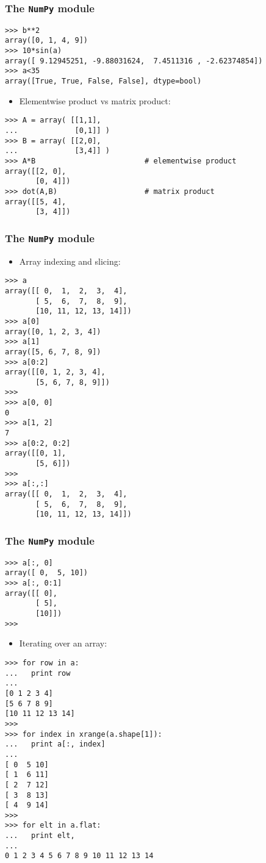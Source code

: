 \documentclass[handout]{beamer}
\numberwithin{equation}{section}
\begin{document}
\begin{frame}[fragile]
\frametitle{The {\tt NumPy} module}

\begin{lstlisting}[name=ex2]
>>> b**2
array([0, 1, 4, 9])
>>> 10*sin(a)
array([ 9.12945251, -9.88031624,  7.4511316 , -2.62374854])
>>> a<35
array([True, True, False, False], dtype=bool)
\end{lstlisting}

\pause
\begin{itemize}
\item Elementwise product vs matrix product:
\end{itemize}


\begin{lstlisting}[name=ex2]
>>> A = array( [[1,1],
...             [0,1]] )
>>> B = array( [[2,0],
...             [3,4]] )
>>> A*B                         # elementwise product
array([[2, 0],
       [0, 4]])
>>> dot(A,B)                    # matrix product
array([[5, 4],
       [3, 4]])
\end{lstlisting}
\end{frame}



\begin{frame}[fragile]
\frametitle{The {\tt NumPy} module}

\begin{itemize}
\item Array indexing and slicing:
\end{itemize}

\begin{lstlisting}[name=ex2]
>>> a
array([[ 0,  1,  2,  3,  4],
       [ 5,  6,  7,  8,  9],
       [10, 11, 12, 13, 14]])
>>> a[0]
array([0, 1, 2, 3, 4])
>>> a[1]
array([5, 6, 7, 8, 9])
>>> a[0:2]
array([[0, 1, 2, 3, 4],
       [5, 6, 7, 8, 9]])
>>>
>>> a[0, 0]
0
>>> a[1, 2]
7
>>> a[0:2, 0:2]
array([[0, 1],
       [5, 6]])
>>> 
>>> a[:,:]
array([[ 0,  1,  2,  3,  4],
       [ 5,  6,  7,  8,  9],
       [10, 11, 12, 13, 14]])
\end{lstlisting}
\end{frame}



\begin{frame}[fragile]
\frametitle{The {\tt NumPy} module}

\begin{lstlisting}[name=ex2]
>>> a[:, 0]
array([ 0,  5, 10])
>>> a[:, 0:1]
array([[ 0],
       [ 5],
       [10]])
>>> 
\end{lstlisting}

\pause
\begin{itemize}
\item Iterating over an array:
\end{itemize}

\begin{lstlisting}[name=ex2]
>>> for row in a:
...   print row
... 
[0 1 2 3 4]
[5 6 7 8 9]
[10 11 12 13 14]
>>> 
>>> for index in xrange(a.shape[1]):
...   print a[:, index]
... 
[ 0  5 10]
[ 1  6 11]
[ 2  7 12]
[ 3  8 13]
[ 4  9 14]
>>> 
>>> for elt in a.flat:
...   print elt,
... 
0 1 2 3 4 5 6 7 8 9 10 11 12 13 14
\end{lstlisting}
\end{frame}
\end{document}

